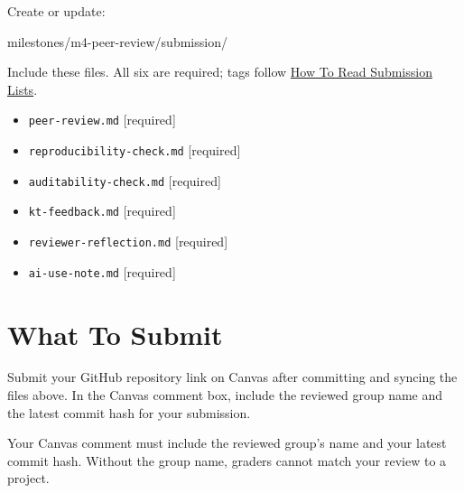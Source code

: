 \documentclass[
  letterpaper,
  DIV=11,
  numbers=noendperiod,
  oneside]{scrreprt}
\newenvironment{Shaded}{\begin{snugshade}}{\end{snugshade}}
\newcommand{\NormalTok}[1]{\textcolor[rgb]{0.00,0.23,0.31}{#1}}
\providecommand{\tightlist}{%
  \setlength{\itemsep}{0pt}\setlength{\parskip}{0pt}}
\begin{document}
Create or update:

\begin{Shaded}
\begin{Highlighting}[numbers=left,,]
\NormalTok{milestones/m4{-}peer{-}review/submission/}
\end{Highlighting}
\end{Shaded}

Include these files. All six are required; tags follow
\hyperref[how-to-read-submission-lists]{How To Read Submission Lists}.

\begin{itemize}
\tightlist
\item
  \texttt{peer-review.md} {[}required{]}
\item
  \texttt{reproducibility-check.md} {[}required{]}
\item
  \texttt{auditability-check.md} {[}required{]}
\item
  \texttt{kt-feedback.md} {[}required{]}
\item
  \texttt{reviewer-reflection.md} {[}required{]}
\item
  \texttt{ai-use-note.md} {[}required{]}
\end{itemize}

\section{What To Submit}\label{what-to-submit-14}

Submit your GitHub repository link on Canvas after committing and
syncing the files above. In the Canvas comment box, include the reviewed
group name and the latest commit hash for your submission.

\begin{tcolorbox}[enhanced jigsaw, title=\textcolor{quarto-callout-important-color}{\faExclamation}\hspace{0.5em}{Easy to miss: name the group you reviewed}, arc=.35mm, toptitle=1mm, colframe=quarto-callout-important-color-frame, toprule=.15mm, leftrule=.75mm, bottomtitle=1mm, opacityback=0, bottomrule=.15mm, coltitle=black, breakable, opacitybacktitle=0.6, titlerule=0mm, colback=white, left=2mm, colbacktitle=quarto-callout-important-color!10!white, rightrule=.15mm]

Your Canvas comment must include the reviewed group's name and your
latest commit hash. Without the group name, graders cannot match your
review to a project.

\end{tcolorbox}
\end{document}
